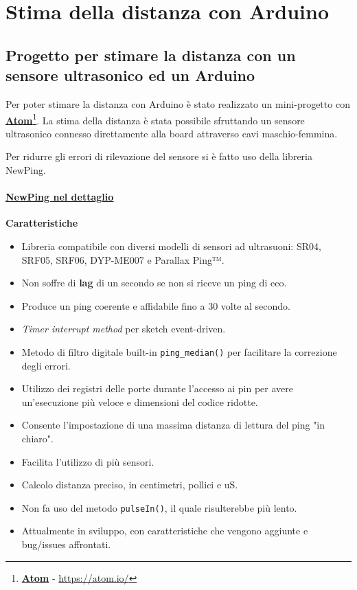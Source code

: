 \chapter{Stima della distanza con Arduino}
\section{Progetto per stimare la distanza con un sensore ultrasonico ed un Arduino}
Per poter stimare la distanza con Arduino è stato realizzato un mini-progetto con \href{https://atom.io/}{\textbf{Atom}}\footnote{\href{https://atom.io/}{\textbf{Atom}} - \url{https://atom.io/}}. La stima della distanza è stata possibile sfruttando un sensore ultrasonico connesso direttamente alla board attraverso cavi maschio-femmina.

Per ridurre gli errori di rilevazione del sensore si è fatto uso della libreria NewPing.

\subsubsection{\underline{\href{http://playground.arduino.cc/Code/NewPing}{NewPing nel dettaglio}}}\label{sec:newping}
\textbf{Caratteristiche}
\begin{itemize}
	\item Libreria compatibile con diversi modelli di sensori ad ultrasuoni: SR04, SRF05, SRF06, DYP-ME007 e Parallax Ping™.
	
	\item Non soffre di \textbf{lag} di un secondo se non si riceve un ping di eco.
	
	\item Produce un ping coerente e affidabile fino a 30 volte al secondo.
	
	\item \textit{Timer interrupt method} per sketch event-driven.
	
	\item Metodo di filtro digitale built-in \texttt{ping\_median()} per facilitare la correzione degli errori.
	
	\item Utilizzo dei registri delle porte durante l'accesso ai pin per avere un'esecuzione più veloce e dimensioni del codice ridotte.
	
	\item Consente l'impostazione di una massima distanza di lettura del ping "in chiaro".
	
	\item Facilita l'utilizzo di più sensori.
	
	\item Calcolo distanza preciso, in centimetri, pollici e uS.
	
	\item Non fa uso del metodo \texttt{pulseIn()}, il quale risulterebbe più lento.
	
	\item Attualmente in sviluppo, con caratteristiche che vengono aggiunte e bug/issues affrontati.
\end{itemize}

